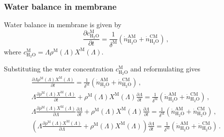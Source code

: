 \documentclass[pdftex,a4paper, 12pt]{article}
\begin{document}
\subsubsection*{Water balance in membrane}
%
Water balance in membrane is given by
%
\begin{equation}
	\frac{\partial c_{\mathrm{H_2O}}^{\mathrm{M}}}{\partial t} =\frac{1}{\delta^{\mathrm{M}}}\left(\dot{n}_{\mathrm{H}_{2} \mathrm{O}}^{\mathrm{A M}}+\dot{n}_{\mathrm{H}_{2} \mathrm{O}}^{\mathrm{C M}}\right) \, ,
	\label{eq:membr_bal}
\end{equation}
%
where $c_{\mathrm{H_2O}}^{\mathrm{M}} = \mathit{\Lambda} \rho^{\mathrm{M}}(\mathit{\Lambda}) X^{\mathrm{M}}(\mathit{\Lambda})$.
%
\par
%
Substituting the water concentration $c_{\mathrm{H_2O}}^{\mathrm{M}}$ and reformulating gives
%
\begin{align}
	\frac{\partial \mathit{\Lambda} \rho^{\mathrm{M}}(\mathit{\Lambda}) X^{\mathrm{M}}(\mathit{\Lambda})}{\partial t} =\frac{1}{\delta^{\mathrm{M}}}\left(\dot{n}_{\mathrm{H}_{2} \mathrm{O}}^{\mathrm{A M}}+\dot{n}_{\mathrm{H}_{2} \mathrm{O}}^{\mathrm{C M}}\right) \, ,\\
	\mathit{\Lambda} \frac{\partial \rho^{\mathrm{M}}(\mathit{\Lambda}) X^{\mathrm{M}}(\mathit{\Lambda})}{\partial t} + \rho^{\mathrm{M}}(\mathit{\Lambda}) X^{\mathrm{M}}(\mathit{\Lambda}) \frac{\partial \mathit{\Lambda}}{\partial t} =\frac{1}{\delta^{\mathrm{M}}}\left(\dot{n}_{\mathrm{H}_{2} \mathrm{O}}^{\mathrm{A M}}+\dot{n}_{\mathrm{H}_{2} \mathrm{O}}^{\mathrm{C M}}\right) \, ,\\
	\mathit{\Lambda} \frac{\partial \rho^{\mathrm{M}}(\mathit{\Lambda}) X^{\mathrm{M}}(\mathit{\Lambda})}{\partial \mathit{\Lambda}} \frac{\partial \mathit{\Lambda}}{\partial t} + \rho^{\mathrm{M}}(\mathit{\Lambda}) X^{\mathrm{M}}(\mathit{\Lambda}) \frac{\partial \mathit{\Lambda}}{\partial t} =\frac{1}{\delta^{\mathrm{M}}}\left(\dot{n}_{\mathrm{H}_{2} \mathrm{O}}^{\mathrm{A M}}+\dot{n}_{\mathrm{H}_{2} \mathrm{O}}^{\mathrm{C M}}\right) \, ,\\
	\left( \mathit{\Lambda} \frac{\partial \rho^{\mathrm{M}}(\mathit{\Lambda}) X^{\mathrm{M}}(\mathit{\Lambda})}{\partial \mathit{\Lambda}}  + \rho^{\mathrm{M}}(\mathit{\Lambda}) X^{\mathrm{M}}(\mathit{\Lambda}) \right) \frac{\partial \mathit{\Lambda}}{\partial t} =\frac{1}{\delta^{\mathrm{M}}}\left(\dot{n}_{\mathrm{H}_{2} \mathrm{O}}^{\mathrm{A M}}+\dot{n}_{\mathrm{H}_{2} \mathrm{O}}^{\mathrm{C M}}\right) \, .
\end{align}
%
%
\end{document}
